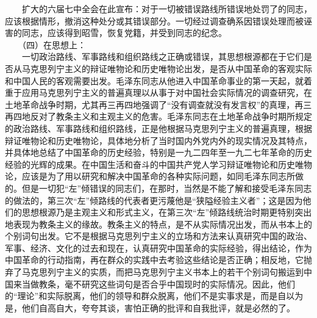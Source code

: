 \documentclass[cn,11pt,chinese]{elegantbook}
\begin{document}
　　扩大的六届七中全会在此宣布：对于一切被错误路线所错误地处罚了的同志，应该根据情形，撤消这种处分或其错误部分。一切经过调查确系因错误处理而被诬害的同志，应该得到昭雪，恢复党籍，并受到同志的纪念。\\
　　（四）在思想上：\\
　　一切政治路线、军事路线和组织路线之正确或错误，其思想根源都在于它们是否从马克思列宁主义的辩证唯物论和历史唯物论出发，是否从中国革命的客观实际和中国人民的客观需要出发。毛泽东同志从他进入中国革命事业的第一天起，就着重于应用马克思列宁主义的普遍真理以从事于对中国社会实际情况的调查研究，在土地革命战争时期，尤其再三再四地强调了“没有调查就没有发言权”的真理，再三再四地反对了教条主义和主观主义的危害。毛泽东同志在土地革命战争时期所规定的政治路线、军事路线和组织路线，正是他根据马克思列宁主义的普遍真理，根据辩证唯物论和历史唯物论，具体地分析了当时国内外党内外的现实情况及其特点，并具体地总结了中国革命的历史经验，特别是一九二四年至一九二七年革命的历史经验的光辉的成果。在中国生活和奋斗的中国共产党人学习辩证唯物论和历史唯物论，应该是为了用以研究和解决中国革命的各种实际问题，如同毛泽东同志所做的。但是一切犯“左”倾错误的同志们，在那时，当然是不能了解和接受毛泽东同志的做法的，第三次“左”倾路线的代表者更污蔑他是“狭隘经验主义者”；这是因为他们的思想根源乃是主观主义和形式主义，在第三次“左”倾路线统治时期更特别突出地表现为教条主义的缘故。教条主义的特点，是不从实际情况出发，而从书本上的个别词句出发。它不是根据马克思列宁主义的立场和方法来认真研究中国的政治、军事、经济、文化的过去和现在，认真研究中国革命的实际经验，得出结论，作为中国革命的行动指南，再在群众的实践中去考验这些结论是否正确；相反地，它抛弃了马克思列宁主义的实质，而把马克思列宁主义书本上的若干个别词句搬运到中国来当做教条，毫不研究这些词句是否合乎中国现时的实际情况。因此，他们的“理论”和实际脱离，他们的领导和群众脱离，他们不是实事求是，而是自以为是，他们自高自大，夸夸其谈，害怕正确的批评和自我批评，就是必然的了。\\
\end{document}
